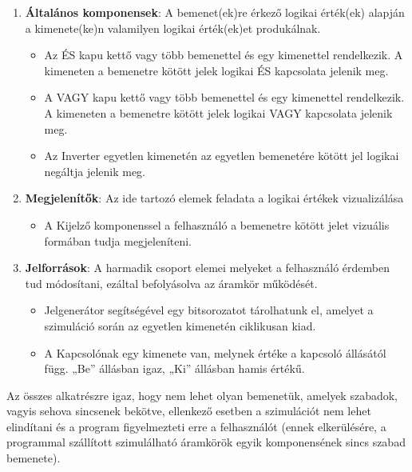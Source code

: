 \begin{enumerate}
\item \textbf{Általános komponensek}: A bemenet(ek)re érkező logikai érték(ek) alapján a kimenete(ke)n valamilyen logikai érték(ek)et produkálnak.
\begin{itemize}
\setlength{\itemsep}{0cm}%
\setlength{\parskip}{0cm}%
\item Az ÉS kapu kettő vagy több bemenettel és egy kimenettel rendelkezik. A kimeneten a bemenetre kötött jelek logikai ÉS kapcsolata jelenik meg. 
\item A VAGY kapu kettő vagy több bemenettel és egy kimenettel rendelkezik. A kimeneten a bemenetre kötött jelek logikai VAGY kapcsolata jelenik meg.
\item Az Inverter egyetlen kimenetén az egyetlen bemenetére kötött jel logikai negáltja jelenik meg.
\end{itemize}

\item \textbf{Megjelenítők}: Az ide tartozó elemek feladata a logikai értékek vizualizálása
\begin{itemize}
\setlength{\itemsep}{0cm}%
\setlength{\parskip}{0cm}%
\item A Kijelző komponenssel a felhasználó a bemenetre kötött jelet vizuális formában tudja megjeleníteni.
\end{itemize}

\item \textbf{Jelforrások}: A harmadik csoport elemei melyeket a felhasználó érdemben tud módosítani, ezáltal befolyásolva az áramkör működését.
\begin{itemize}
\setlength{\itemsep}{0cm}%
\setlength{\parskip}{0cm}%
\item Jelgenerátor segítségével egy bitsorozatot tárolhatunk el, amelyet a szimuláció során az egyetlen kimenetén ciklikusan kiad.
\item A Kapcsolónak egy kimenete van, melynek értéke a kapcsoló állásától függ. „Be” állásban igaz, „Ki” állásban hamis értékű.
\end{itemize}
\end{enumerate}

Az összes alkatrészre igaz, hogy nem lehet olyan bemenetük, amelyek szabadok, vagyis sehova sincsenek bekötve, ellenkező esetben a szimulációt nem lehet elindítani és a program figyelmezteti erre a felhasználót (ennek elkerülésére, a programmal szállított szimulálható áramkörök egyik komponensének sincs szabad bemenete).

